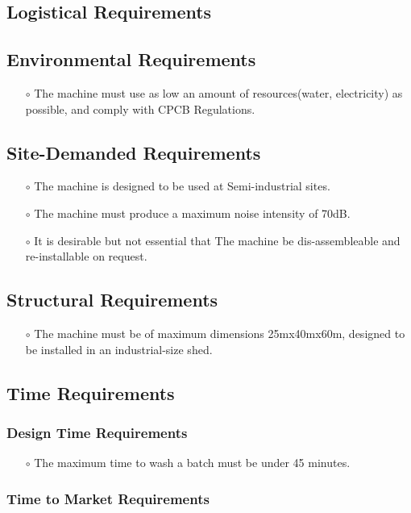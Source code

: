 \documentclass[12pt]{article}
\begin{document}
\subsection{Logistical Requirements}
\subsection{Environmental Requirements}
\begin{itemize}
    \item[$\scriptstyle\circ$] The machine must use as low an amount of resources(water, electricity) as possible, and comply with CPCB Regulations.
\end{itemize}
\subsection{Site-Demanded Requirements}
\begin{itemize}
    \item[$\scriptstyle\circ$] The machine is designed to be used at Semi-industrial sites.
    \item[$\scriptstyle\circ$] The machine must produce a maximum noise intensity of 70dB.
    \item[$\scriptstyle\circ$] It is desirable but not essential that The machine be dis-assembleable and re-installable on request.
\end{itemize}
\subsection{Structural Requirements}
\begin{itemize}
    \item[$\scriptstyle\circ$] The machine must be of maximum dimensions 25mx40mx60m, designed to be installed in an industrial-size shed.
\end{itemize}
\subsection{Time Requirements}
\subsubsection{Design Time Requirements}
    \begin{itemize}
        \item[$\scriptstyle\circ$] The maximum time to wash a batch must be under 45 minutes.
    \end{itemize}
\subsubsection{Time to Market Requirements}
\end{document}
